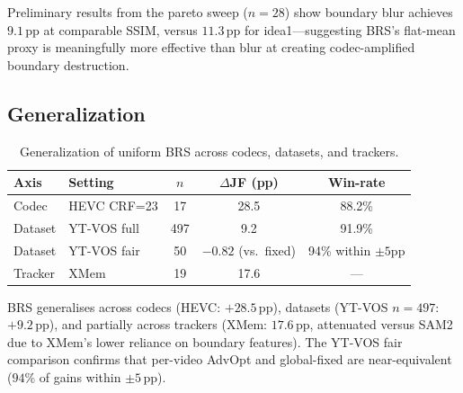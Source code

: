 
Preliminary results from the pareto sweep ($n{=}28$) show boundary blur achieves $9.1\,\mathrm{pp}$ at comparable SSIM, versus $11.3\,\mathrm{pp}$ for idea1---suggesting BRS's flat-mean proxy is meaningfully more effective than blur at creating codec-amplified boundary destruction.

\subsection{Generalization}

\begin{table}[t]
\centering
\small
\caption{Generalization of uniform BRS across codecs, datasets, and trackers.}
\label{tab:generalization}
\begin{tabular}{llccc}
\toprule
\textbf{Axis} & \textbf{Setting} & \textbf{$n$} & \textbf{$\Delta$JF (pp)} & \textbf{Win-rate} \\
\midrule
Codec    & HEVC CRF=23  & 17  & 28.5 & 88.2\% \\
Dataset  & YT-VOS full  & 497 & 9.2  & 91.9\% \\
Dataset  & YT-VOS fair  & 50  & $-0.82$ (vs.\ fixed) & 94\% within $\pm 5$pp \\
Tracker  & XMem         & 19  & 17.6 & --- \\
\bottomrule
\end{tabular}
\end{table}

BRS generalises across codecs (HEVC: $+28.5\,\mathrm{pp}$), datasets (YT-VOS $n{=}497$: $+9.2\,\mathrm{pp}$), and partially across trackers (XMem: $17.6\,\mathrm{pp}$, attenuated versus SAM2 due to XMem's lower reliance on boundary features).
The YT-VOS fair comparison confirms that per-video AdvOpt and global-fixed are near-equivalent ($94\%$ of gains within $\pm 5\,\mathrm{pp}$).

